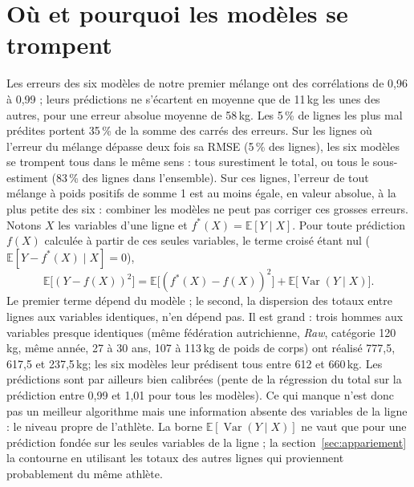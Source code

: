 \documentclass[11pt,a4paper]{article}
\newcommand{\kg}{\,kg}
\begin{document}
\section{Où et pourquoi les modèles se trompent}\label{sec:erreurs}
Les erreurs des six modèles de notre premier mélange ont des corrélations de 0,96 à 0,99 ; leurs
prédictions ne s'écartent en moyenne que de 11\kg{} les unes des autres, pour une erreur absolue moyenne de
58\kg. Les 5\,\% de lignes les plus mal prédites portent 35\,\% de la somme des carrés des erreurs. Sur
les lignes où l'erreur du mélange dépasse deux fois sa RMSE (5\,\% des lignes), les six modèles se trompent
tous dans le même sens : tous surestiment le total, ou tous le sous-estiment (83\,\% des lignes dans
l'ensemble). Sur ces lignes, l'erreur de tout mélange à poids positifs de somme 1 est au moins égale, en
valeur absolue, à la plus petite des six : combiner les modèles ne peut pas corriger ces grosses erreurs. Notons $X$ les variables d'une ligne et $f^*(X)=\mathbb{E}[Y\mid X]$. Pour toute prédiction
$f(X)$ calculée à partir de ces seules variables, le terme croisé étant nul ($\mathbb{E}[Y-f^*(X)\mid X]=0$),
\[\mathbb{E}\big[(Y-f(X))^2\big]=\mathbb{E}\big[(f^*(X)-f(X))^2\big]+\mathbb{E}\big[\operatorname{Var}(Y\mid X)\big].\]
Le premier terme dépend du modèle ; le second, la dispersion des totaux entre lignes aux variables identiques,
n'en dépend pas. Il est grand : trois hommes aux variables presque identiques (même fédération autrichienne,
\emph{Raw}, catégorie 120\kg, même année, 27 à 30 ans, 107 à 113\kg{} de poids de corps) ont réalisé 777,5, 617,5 et 237,5\kg ; les six modèles
leur prédisent tous entre 612 et 660\kg. Les prédictions sont par ailleurs bien calibrées (pente de la
régression du total sur la prédiction entre 0,99 et 1,01 pour tous les modèles). Ce qui manque n'est donc pas
un meilleur algorithme mais une information absente des variables de la ligne : le niveau propre de
l'athlète. La borne $\mathbb{E}[\operatorname{Var}(Y\mid X)]$ ne vaut que pour une prédiction fondée sur les
seules variables de la ligne ; la section~\ref{sec:appariement} la contourne en utilisant les totaux des autres
lignes qui proviennent probablement du même athlète.

\end{document}
